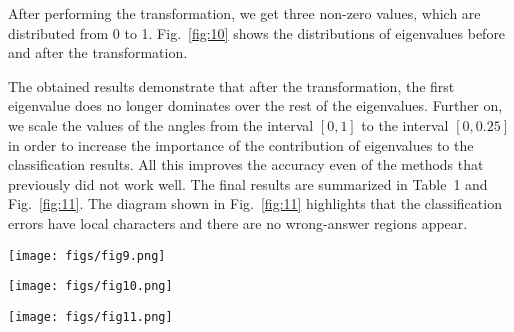 \documentclass[%
 aip,
 floatfix,
 amsmath,amssymb,
 reprint,%
]{revtex4-1}
\begin{document}
After performing the transformation, we get three non-zero values, which are distributed from 0 to 1. Fig.~\ref{fig:10} shows the distributions of eigenvalues before and after the transformation. 

The obtained results demonstrate  that after the transformation, the first eigenvalue does no longer dominates over the rest of the eigenvalues. Further on, we scale the values of the angles from the interval $[0, 1]$  to the interval $[0, 0.25]$ in order to increase the importance of the contribution of eigenvalues to the classification results. All this improves the accuracy even of the methods that previously did not work well. The final results are summarized in Table~1 and Fig.~\ref{fig:11}. The diagram shown in Fig.~\ref{fig:11} highlights that the classification errors have local characters and there are no wrong-answer regions appear.

\begin{figure*}[t]
  \texttt{[image: figs/fig9.png]}
  \caption{
  Classification accuracy for three datasets: a) generated by using the Choi eigenvalues and their functions, square roots and fourth-order roots (green); b) generated by using elements of the Choi matrices (light blue); c) generated by using the Choi eigenvalues and eigenvectors after appropriate normalization (magenta). Samples from Problem~I and Problem~II were used for training and testing. The accuracy is quantified by using three different measures (see Section VA). The center of a diagram corresponds to accuracy $0.4$.} \label{fig:9}
\end{figure*}

\begin{figure*}[h]
  \texttt{[image: figs/fig10.png]}
  \caption{The distribution of the eigenvalues of Choi matrices before (top row) and after (bottom row) the transformation, Eq.~(17).} \label{fig:10}
\end{figure*}

\begin{figure*}[h]
  \texttt{[image: figs/fig11.png]}
  \caption{'Yes/no' partition of the parameter space for Problems~I (top row) and II (bottom row) for different values of phase shift. Partitions are obtained by using the test, Eq.~(13) [left] and ML methods, the Nearest neighbors method [center] and the Random forest method [right]. For the ML methods the parametrization based on the eigenvalues, normalized with the transformation (17), and eigenvectors of Choi matrices, is used.} \label{fig:11}
\end{figure*}
\end{document}
